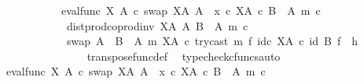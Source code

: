 \begin{isabellebody}
\ \ \ \ \ \ \ \ \ \ {\isacharequal}{\kern0pt}\ {\isacharparenleft}{\kern0pt}{\isacharparenleft}{\kern0pt}eval{\isacharunderscore}{\kern0pt}func\ X\ A\ {\isasymcirc}\isactrlsub c\ swap\ {\isacharparenleft}{\kern0pt}X\isactrlbsup A\isactrlesup {\isacharparenright}{\kern0pt}\ A{\isacharparenright}{\kern0pt}\ {\isasymamalg}\ {\isacharparenleft}{\kern0pt}x\ {\isasymcirc}\isactrlsub c\ {\isasymbeta}\isactrlbsub X\isactrlbsup A\isactrlesup \ {\isasymtimes}\isactrlsub c\ {\isacharparenleft}{\kern0pt}B\ {\isasymsetminus}\ {\isacharparenleft}{\kern0pt}A{\isacharcomma}{\kern0pt}\ m{\isacharparenright}{\kern0pt}{\isacharparenright}{\kern0pt}\isactrlesub {\isacharparenright}{\kern0pt}\ {\isasymcirc}\isactrlsub c\isanewline
\ \ \ \ \ \ \ \ \ \ \ \ dist{\isacharunderscore}{\kern0pt}prod{\isacharunderscore}{\kern0pt}coprod{\isacharunderscore}{\kern0pt}inv\ {\isacharparenleft}{\kern0pt}X\isactrlbsup A\isactrlesup {\isacharparenright}{\kern0pt}\ A\ {\isacharparenleft}{\kern0pt}B\ {\isasymsetminus}\ {\isacharparenleft}{\kern0pt}A{\isacharcomma}{\kern0pt}\ m{\isacharparenright}{\kern0pt}{\isacharparenright}{\kern0pt}\ {\isasymcirc}\isactrlsub c\isanewline
\ \ \ \ \ \ \ \ \ \ \ \ swap\ {\isacharparenleft}{\kern0pt}A\ {\isasymCoprod}\ {\isacharparenleft}{\kern0pt}B\ {\isasymsetminus}\ {\isacharparenleft}{\kern0pt}A{\isacharcomma}{\kern0pt}\ m{\isacharparenright}{\kern0pt}{\isacharparenright}{\kern0pt}{\isacharparenright}{\kern0pt}\ {\isacharparenleft}{\kern0pt}X\isactrlbsup A\isactrlesup {\isacharparenright}{\kern0pt}\ {\isasymcirc}\isactrlsub c\ try{\isacharunderscore}{\kern0pt}cast\ m\ {\isasymtimes}\isactrlsub f\ id\isactrlsub c\ {\isacharparenleft}{\kern0pt}X\isactrlbsup A\isactrlesup {\isacharparenright}{\kern0pt}{\isacharparenright}{\kern0pt}\ {\isasymcirc}\isactrlsub c\ {\isacharparenleft}{\kern0pt}id\ B\ {\isasymtimes}\isactrlsub f\ \ h{\isacharparenright}{\kern0pt}{\isachardoublequoteclose}\isanewline
\ \ \ \ \ \ \ \ \ \ \ \ \isamarkupfalse%
\ \ \ transpose{\isacharunderscore}{\kern0pt}func{\isacharunderscore}{\kern0pt}def\ \isamarkupfalse%
\ {\isacharparenleft}{\kern0pt}typecheck{\isacharunderscore}{\kern0pt}cfuncs{\isacharcomma}{\kern0pt}auto{\isacharparenright}{\kern0pt}\isanewline
\ \ \ \ \ \ \ \ \ \ \isamarkupfalse%
\ \isamarkupfalse%
\ {\isachardoublequoteopen}{\isacharparenleft}{\kern0pt}{\isacharparenleft}{\kern0pt}{\isacharparenleft}{\kern0pt}eval{\isacharunderscore}{\kern0pt}func\ X\ A\ {\isasymcirc}\isactrlsub c\ swap\ {\isacharparenleft}{\kern0pt}X\isactrlbsup A\isactrlesup {\isacharparenright}{\kern0pt}\ A{\isacharparenright}{\kern0pt}\ {\isasymamalg}\ {\isacharparenleft}{\kern0pt}x\ {\isasymcirc}\isactrlsub c\ {\isasymbeta}\isactrlbsub X\isactrlbsup A\isactrlesup \ {\isasymtimes}\isactrlsub c\ {\isacharparenleft}{\kern0pt}B\ {\isasymsetminus}\ {\isacharparenleft}{\kern0pt}A{\isacharcomma}{\kern0pt}\ m{\isacharparenright}{\kern0pt}{\isacharparenright}{\kern0pt}\isactrlesub {\isacharparenright}{\kern0pt}\ {\isasymcirc}\isactrlsub c\isanewline

\end{isabellebody}
